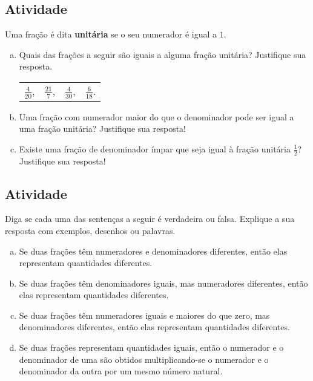 \subsection{Atividade}

Uma fração é dita {\bf unitária} se o seu numerador é igual a $1$.
\begin{enumerate}[a)]
\item  Quais das frações a seguir são iguais a alguma fração unitária? Justifique sua resposta.

\begin{center}
\begin{tabular}{m{}m{}m{}m{}}
$\frac{4}{20}$, & $\frac{21}{7}$, & $\frac{4}{30}$, & $\frac{6}{18}$.
\end{tabular}
\end{center}

\item  Uma fração com numerador maior do que o denominador pode ser igual a uma fração unitária? Justifique sua resposta!

\item  Existe uma fração de denominador ímpar que seja igual à fração unitária $\frac{1}{2}$? Justifique sua resposta!
\end{enumerate}

\subsection{Atividade}

Diga se cada uma das sentenças a seguir é verdadeira ou falsa. Explique a sua resposta com exemplos, desenhos ou palavras.
\begin{enumerate}[a)]
 \item  Se duas frações têm numeradores e denominadores diferentes, então elas representam quantidades diferentes.
 \item Se duas frações têm denominadores iguais, mas numeradores diferentes, então elas representam quantidades diferentes.
 \item Se duas frações têm numeradores iguais e maiores do que zero, mas denominadores diferentes, então elas representam quantidades diferentes.
 \item Se duas frações representam quantidades iguais, então o numerador e o denominador de uma são obtidos multiplicando-se o numerador e o denominador da outra por um mesmo número natural.
\end{enumerate}


